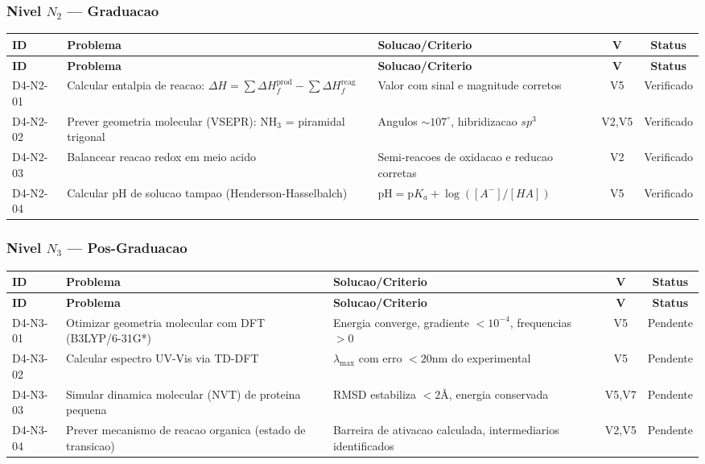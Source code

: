 \subsubsection{Nivel $N_2$ --- Graduacao}

\begin{longtable}{|p{2.0cm}|p{4.2cm}|p{4.2cm}|c|c|}
\hline
\textbf{ID} & \textbf{Problema} & \textbf{Solucao/Criterio} & \textbf{V} & \textbf{Status} \\
\hline
\endfirsthead
\hline
\textbf{ID} & \textbf{Problema} & \textbf{Solucao/Criterio} & \textbf{V} & \textbf{Status} \\
\hline
\endhead
\hline
\endfoot
D4-N2-01 & Calcular entalpia de reacao: $\Delta H=\sum\Delta H_{f}^{\text{prod}}-\sum\Delta H_{f}^{\text{reag}}$ & Valor com sinal e magnitude corretos & V5 & Verificado \\
\hline
D4-N2-02 & Prever geometria molecular (VSEPR): $\text{NH}_{3}$ = piramidal trigonal & Angulos $\sim 107^{\circ}$, hibridizacao $sp^{3}$ & V2,V5 & Verificado \\
\hline
D4-N2-03 & Balancear reacao redox em meio acido & Semi-reacoes de oxidacao e reducao corretas & V2 & Verificado \\
\hline
D4-N2-04 & Calcular pH de solucao tampao (Henderson-Hasselbalch) & $\text{pH}=\text{p}K_{a}+\log([A^{-}]/[HA])$ & V5 & Verificado \\
\hline
\end{longtable}

\subsubsection{Nivel $N_3$ --- Pos-Graduacao}

\begin{longtable}{|p{2.0cm}|p{4.2cm}|p{4.2cm}|c|c|}
\hline
\textbf{ID} & \textbf{Problema} & \textbf{Solucao/Criterio} & \textbf{V} & \textbf{Status} \\
\hline
\endfirsthead
\hline
\textbf{ID} & \textbf{Problema} & \textbf{Solucao/Criterio} & \textbf{V} & \textbf{Status} \\
\hline
\endhead
\hline
\endfoot
D4-N3-01 & Otimizar geometria molecular com DFT (B3LYP/6-31G*) & Energia converge, gradiente $<10^{-4}$, frequencias $>0$ & V5 & Pendente \\
\hline
D4-N3-02 & Calcular espectro UV-Vis via TD-DFT & $\lambda_{\max}$ com erro $<20$nm do experimental & V5 & Pendente \\
\hline
D4-N3-03 & Simular dinamica molecular (NVT) de proteina pequena & RMSD estabiliza $<2$\AA, energia conservada & V5,V7 & Pendente \\
\hline
D4-N3-04 & Prever mecanismo de reacao organica (estado de transicao) & Barreira de ativacao calculada, intermediarios identificados & V2,V5 & Pendente \\
\hline
\end{longtable}

